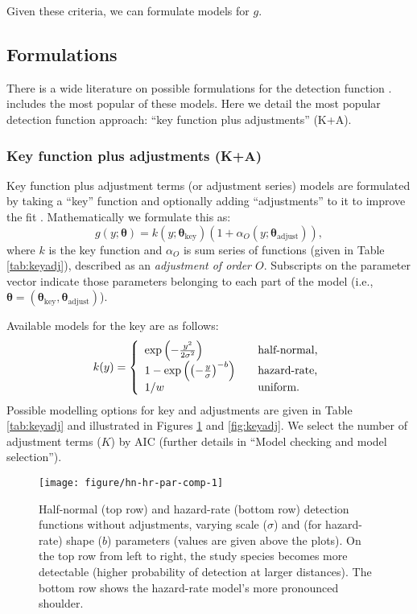 \documentclass[article]{jss}\usepackage[]{graphicx}\usepackage[]{color}
\makeatletter
\def\maxwidth{ %
  \ifdim\Gin@nat@width>\linewidth
    \linewidth
  \else
    \Gin@nat@width
  \fi
}
\makeatother
\begin{document}
Given these criteria, we can formulate models for $g$.

\subsection{Formulations}

There is a wide literature on possible formulations for the detection function \citep{Buckland:1992fa, Eidous:2005bj, Becker:2009cj, Giammarino:2014eg, Miller:2015hw, Becker:2015fi}.  includes the most popular of these models. Here we detail the most popular detection function approach: ``key function plus adjustments'' (K+A).

\subsubsection{Key function plus adjustments (K+A)}

Key function plus adjustment terms (or adjustment series) models are formulated by taking a ``key'' function and optionally adding ``adjustments'' to it to improve the fit \citep{Buckland:1992fa}. Mathematically we formulate this as:
$$
g(y; \boldsymbol{\theta}) = k(y; \boldsymbol{\theta}_\text{key})\left( 1+ \alpha_O(y; \boldsymbol{\theta}_\text{adjust})\right),
$$
where $k$ is the key function and $\alpha_O$ is sum series of functions (given in Table \ref{tab:keyadj}), described as an \textit{adjustment of order $O$}. Subscripts on the parameter vector indicate those parameters belonging to each part of the model (i.e., $\boldsymbol{\theta} = (\boldsymbol{\theta}_\text{key}, \boldsymbol{\theta}_\text{adjust})$).

Available models for the key are as follows:
$$
k(y) = \left\{
\begin{array}{l l}
  \exp\left(-\frac{y^2}{2 \sigma^2}\right) & \quad \text{half-normal,} \\
  1-\exp\left(\left(-\frac{y}{\sigma}\right)^{-b}\right) & \quad \text{hazard-rate,} \\
  1/w & \quad \text{uniform.}
\end{array} \right.
$$
Possible modelling options for key and adjustments are given in Table \ref{tab:keyadj} and illustrated in Figures \ref{fig:hnhr} and \ref{fig:keyadj}. We select the number of adjustment terms ($K$) by AIC (further details in ``Model checking and model selection'').

\begin{figure}
\begin{center}
\begin{Schunk}

\texttt{[image: figure/hn-hr-par-comp-1]} \end{Schunk}
\caption{Half-normal (top row) and hazard-rate (bottom row) detection functions without adjustments, varying scale ($\sigma$) and (for hazard-rate) shape ($b$) parameters (values are given above the plots). On the top row from left to right, the study species becomes more detectable (higher probability of detection at larger distances). The bottom row shows the hazard-rate model's more pronounced shoulder.}
\label{fig:hnhr}
\end{center}
\end{figure}
\end{document}
